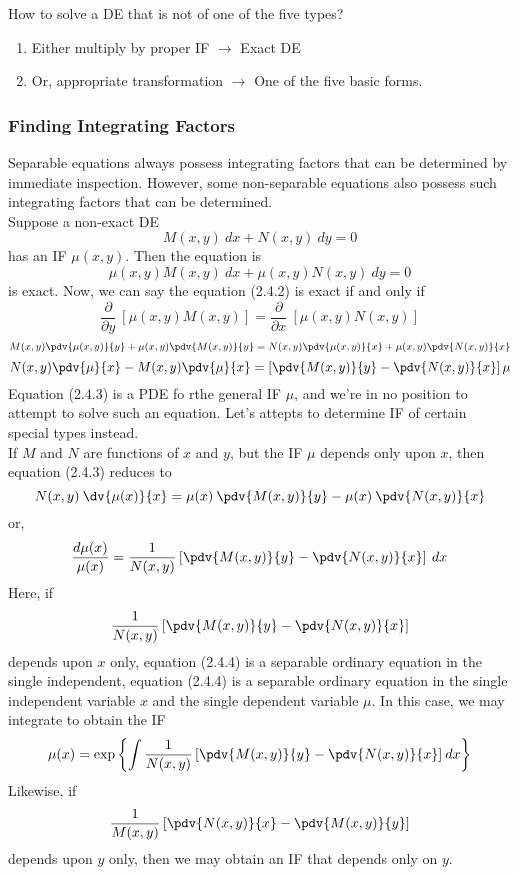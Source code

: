 How to solve a DE that is not of one of the five types?
\begin{enumerate}
    \item Either multiply by proper IF $ \to $ Exact DE
    \item Or, appropriate transformation $ \to $ One of the five basic forms.
\end{enumerate}

\vspace{20pt}
\subsubsection{Finding Integrating Factors}

Separable equations always possess integrating factors that can be determined by immediate inspection. However, some non-separable equations also possess such integrating factors that can be determined.\\

Suppose a non-exact DE
\begin{equation}
    M(x,y) \: d{x} + N(x,y) \: d{y} = 0
\end{equation}
has an IF $\mu(x,y)$. Then the equation is
\begin{equation}
    \mu(x,y)M(x,y) \: d{x} + \mu(x,y)N(x,y) \: d{y} = 0
\end{equation}
is exact. Now, we can say the equation (2.4.2) is exact if and only if \[
    \frac{\partial}{\partial{y}} \: \left[ \mu(x,y)M(x,y) \right] = \frac{\partial}{\partial{x}} \: \left[ \mu(x,y)N(x,y) \right]
\]\[
    M(x,y)\pdv{\mu(x,y)}{y} + \mu(x,y)\pdv{M(x,y)}{y} = N(x,y)\pdv{\mu(x,y)}{x} + \mu(x,y)\pdv{N(x,y)}{x} 
\]
\begin{equation}
    N(x,y)\pdv{\mu}{x} - M(x,y)\pdv{\mu}{x} = \left[ \pdv{M(x,y)}{y} - \pdv{N(x,y)}{x} \right] \mu
\end{equation}
Equation (2.4.3) is a PDE fo rthe general IF  $\mu$, and we're in no position to attempt to solve such an equation. Let's attepts to determine IF of certain special types instead.\\
If $M$ and $N$ are functions of $x$ and $y$, but the IF $\mu$ depends only upon $x$, then equation (2.4.3) reduces to
\[
    N(x,y) \: \dv{\mu(x)}{x} = \mu(x) \: \pdv{M(x,y)}{y} - \mu(x) \: \pdv{N(x,y)}{x}
\] or,
    \begin{equation}
        \frac{d\mu(x)}{\mu(x)} = \frac{1}{N(x,y)} \left[ \pdv{M(x,y)}{y} - \pdv{N(x,y)}{x} \right] \: d{x}
    \end{equation}
Here, if \[
    \frac{1}{N(x,y)} \left[ \pdv{M(x,y)}{y} - \pdv{N(x,y)}{x} \right]  
\]
depends upon $x$ only, equation (2.4.4) is a separable ordinary equation in the single independent, equation (2.4.4) is a separable ordinary equation in the single independent variable $x$ and the single dependent variable $\mu$. In this case, we may integrate to obtain the IF
\[
    \mu(x) = \exp \left\{ \int{ \frac{1}{N(x,y)} \left[ \pdv{M(x,y)}{y} - \pdv{N(x,y)}{x} \right] } \: d{x} \right\}
\]
Likewise, if
\[
    \frac{1}{M(x,y)} \left[ \pdv{N(x,y)}{x} - \pdv{M(x,y)}{y} \right]
\] depends upon $y$ only, then we may obtain an IF that depends only on $y$.

